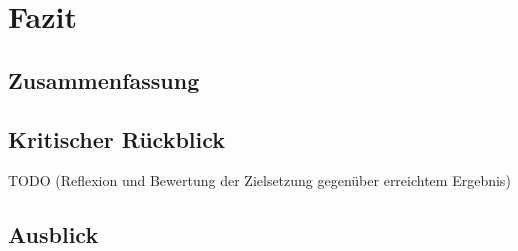 \chapter{Fazit}


\section{Zusammenfassung}


\section{Kritischer Rückblick}

TODO (Reflexion und Bewertung der Zielsetzung gegenüber erreichtem Ergebnis)

\section{Ausblick}
